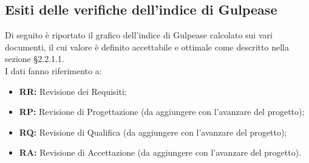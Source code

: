 \subsection{Esiti delle verifiche dell'indice di Gulpease}
Di seguito è riportato il grafico dell'indice di Gulpease calcolato sui vari documenti, il cui valore è definito accettabile e ottimale come descritto nella sezione §2.2.1.1.\\
I dati fanno riferimento a:
\begin{itemize}
	\item \textbf{RR:} Revisione dei Requisiti;
	\item \textbf{RP:} Revisione di Progettazione (da aggiungere con l'avanzare del progetto);
	\item \textbf{RQ:} Revisione di Qualifica (da aggiungere con l'avanzare del progetto);
	\item \textbf{RA:} Revisione di Accettazione (da aggiungere con l'avanzare del progetto).
\end{itemize}

